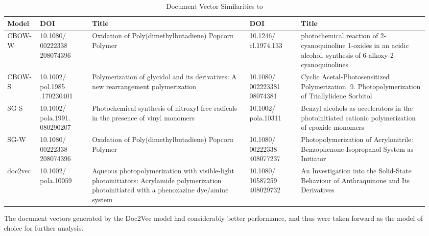 \begin{table}[H]
\centering
\caption{Document Vector Similarities to \cite {docassay}}
\label{tab:DOCSIMS}
\begin{tabular}{|l|p{2cm}|p{4cm}|p{2cm}|p{4cm}|}
\hline
Model           & DOI            & Title            & DOI              & Title              \\ \hline
CBOW-W               & 10.1080/ 00222338 208074396         & \footnotesize{Oxidation of Poly(dimethylbutadiene) Popcorn Polymer} &  10.1246/ cl.1974.133               &                   \footnotesize{photochemical reaction of 2-cyanoquinoline 1-oxides in an acidic alcohol. synthesis of 6-alkoxy-2-cyanoquinolines} \\ \hline
CBOW-S               & 10.1002/ pol.1985 .170230401          &  \footnotesize{Polymerization of glycidol and its derivatives: A new rearrangement polymerization}
                & 10.1080/ 002223381 08074381                & \footnotesize{Cyclic Acetal-Photosensitized Polymerization. 9. Photopolymerization of Triallylidene Sorbitol}
                   \\ \hline
SG-S                 & 10.1002/ pola.1991. 080290207            &   \footnotesize{Photochemical synthesis of nitroxyl free radicals in the presence of vinyl monomers}
               &  10.1002/ pola.10311              &  \footnotesize{Benzyl alcohols as accelerators in the photoinitiated cationic polymerization of epoxide monomers}
                  \\ \hline
SG-W                 & 10.1080/ 00222338 208074396            &    \footnotesize{Oxidation of Poly(dimethylbutadiene) Popcorn Polymer}
              & 10.1080/ 00222338 408077237                &  \footnotesize{Photopolymerization of Acrylonitrile: Benzophenone-Isopropanol System as Initiator}
                 \\ \hline
doc2vec                    &  10.1002/ pola.10059              &  \footnotesize{Aqueous photopolymerization with visible-light photoinitiators: Acrylamide polymerization photoinitiated with a phenoxazine dye/amine system}
                & 10.1080/ 10587259 408029732                 & \footnotesize{ An Investigation into the Solid-State Behaviour of Anthraquinone and Its Derivatives}
                 \\ \hline
\end{tabular}
\end{table}
The document vectors generated by the Doc2Vec model had considerably better performance, and thus were taken forward as the model of choice for further analysis.  
